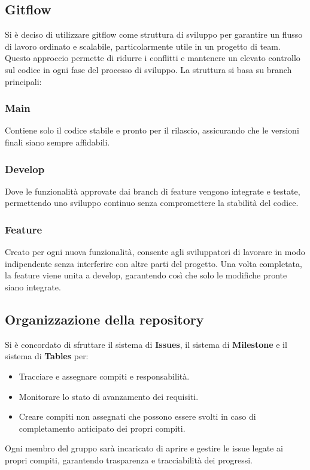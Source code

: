 \documentclass[a4paper, 12pt]{article}
\begin{document}
\subsection{Gitflow}
Si è deciso di utilizzare gitflow come struttura di sviluppo per garantire un flusso di lavoro ordinato e scalabile, particolarmente utile in un progetto di team. Questo approccio permette di ridurre i conflitti e mantenere un elevato controllo sul codice in ogni fase del processo di sviluppo. La struttura si basa su branch principali:

\subsubsection{Main}
Contiene solo il codice stabile e pronto per il rilascio, assicurando che le versioni finali siano sempre affidabili.

\subsubsection{Develop}
Dove le funzionalità approvate dai branch di feature vengono integrate e testate, permettendo uno sviluppo continuo senza compromettere la stabilità del codice.

\subsubsection{Feature}
Creato per ogni nuova funzionalità, consente agli sviluppatori di lavorare in modo indipendente senza interferire con altre parti del progetto. Una volta completata, la feature viene unita a develop, garantendo così che solo le modifiche pronte siano integrate.

\subsection{Organizzazione della repository}
Si è concordato di sfruttare il sistema di \textbf{Issues}, il sistema di \textbf{Milestone} e il sistema di \textbf{Tables} per:
\begin{itemize}
    \item Tracciare e assegnare compiti e responsabilità.
    \item Monitorare lo stato di avanzamento dei requisiti.
    \item Creare compiti non assegnati che possono essere svolti in caso di completamento anticipato dei propri compiti.
\end{itemize}
Ogni membro del gruppo sarà incaricato di aprire e gestire le issue legate ai propri compiti, garantendo trasparenza e tracciabilità dei progressi.
\end{document}
